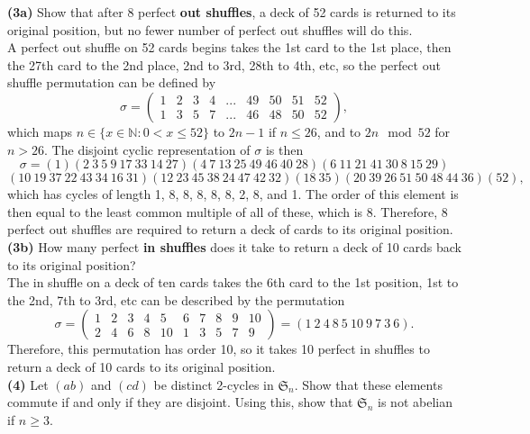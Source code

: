 \documentclass[12pt,letterpaper]{article}
\begin{document}
\textbf{(3a)} Show that after 8 perfect \textbf{out shuffles}, a deck of 52 cards is returned to its original position, but no fewer number of perfect out shuffles will do this.\\

A perfect out shuffle on 52 cards begins takes the 1st card to the 1st place, then the 27th card to the 2nd place, 2nd to 3rd, 28th to 4th, etc, so the perfect out shuffle permutation can be defined by \[\sigma  = \begin{pmatrix} 1 & 2 & 3 & 4 & ... & 49 & 50 & 51 & 52\\ 1 & 3 & 5 & 7 & ... & 46 & 48 & 50 & 52 \end{pmatrix},\] which maps \(n \in \{x \in \mathbb{N} : 0 < x \leq 52\}\) to \(2n-1\) if \(n \leq 26\), and to \(2n \mod 52\) for \(n > 26\). The disjoint cyclic representation of \(\sigma\) is then \[\sigma = (1)(2\ 3\ 5\ 9\ 17\ 33\ 14\ 27)(4\ 7\ 13\ 25\ 49\ 46\ 40\ 28)(6\ 11\ 21\ 41\ 30\ 8\ 15\ 29)\]\[(10\ 19\ 37\ 22\ 43\ 34\ 16\ 31)(12\ 23\ 45\ 38\ 24\ 47\ 42\ 32)(18\ 35)(20\ 39\ 26\ 51\ 50\ 48\ 44\ 36)(52),\] which has cycles of length 1, 8, 8, 8, 8, 8, 2, 8, and 1. The order of this element is then equal to the least common multiple of all of these, which is \(8\). Therefore, \(8\) perfect out shuffles are required to return a deck of cards to its original position. \\

\textbf{(3b)} How many perfect \textbf{in shuffles} does it take to return a deck of 10 cards back to its original position?\\

The in shuffle on a deck of ten cards takes the 6th card to the 1st position, 1st to the 2nd, 7th to 3rd, etc can be described by the permutation \[\sigma = \begin{pmatrix} 1 & 2 & 3 & 4 & 5 & 6 & 7 & 8 & 9 & 10 \\ 2 & 4 & 6 & 8 & 10 & 1 & 3 & 5 & 7 & 9 \end{pmatrix} = (1\ 2\ 4\ 8\ 5\ 10\ 9\ 7\ 3\ 6).\] Therefore, this permutation has order 10, so it takes 10 perfect in shuffles to return a deck of 10 cards to its original position. \\

\textbf{(4)} Let \((ab)\) and \((cd)\) be distinct 2-cycles in \(\mathfrak{S}_{n}\). Show that these elements commute if and only if they are disjoint. Using this, show that \(\mathfrak{S}_{n}\) is not abelian if \(n \geq 3\).\\
\end{document}
